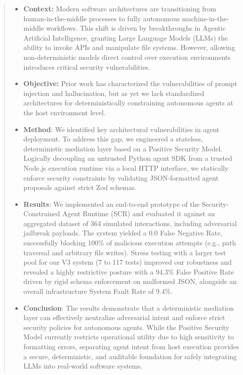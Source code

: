 \documentclass[conference]{IEEEtran}
\begin{document}
\begin{abstract}

\begin{itemize}
    \item \textbf{Context:} Modern software architectures are transitioning from human-in-the-middle processes to fully autonomous machine-in-the-middle workflows. This shift is driven by breakthroughs in Agentic Artificial Intelligence, granting Large Language Models (LLMs) the ability to invoke APIs and manipulate file systems. However, allowing non-deterministic models direct control over execution environments introduces critical security vulnerabilities.
    \item \textbf{Objective:} Prior work has characterized the vulnerabilities of prompt injection and hallucination, but as yet we lack standardized architectures for deterministically constraining autonomous agents at the host environment level.
    \item \textbf{Method}: We identified key architectural vulnerabilities in agent deployment. To address this gap, we engineered a stateless, deterministic mediation layer based on a Positive Security Model. Logically decoupling an untrusted Python agent SDK from a trusted Node.js execution runtime via a local HTTP interface, we statically enforce security constraints by validating JSON-formatted agent proposals against strict Zod schemas.
    \item \textbf{Results}: We implemented an end-to-end prototype of the Security-Constrained Agent Runtime (SCR) and evaluated it against an aggregated dataset of 364 simulated interactions, including adversarial jailbreak payloads. The system yielded a 0.0 False Negative Rate, successfully blocking 100\% of malicious execution attempts (e.g., path traversal and arbitrary file writes). Stress testing with a larger test pool for our V3 system (7 to 117 tests) improved our robustness and revealed a highly restrictive posture with a 94.3\% False Positive Rate driven by rigid schema enforcement on malformed JSON, alongside an overall infrastructure System Fault Rate of 9.4\%. 
    \item \textbf{Conclusion}: The results demonstrate that a deterministic mediation layer can effectively neutralize adversarial intent and enforce strict security policies for autonomous agents. While the Positive Security Model currently restricts operational utility due to high sensitivity to formatting errors, separating agent intent from host execution provides a secure, deterministic, and auditable foundation for safely integrating LLMs into real-world software systems. 
\end{itemize}
\end{abstract}
\end{document}
